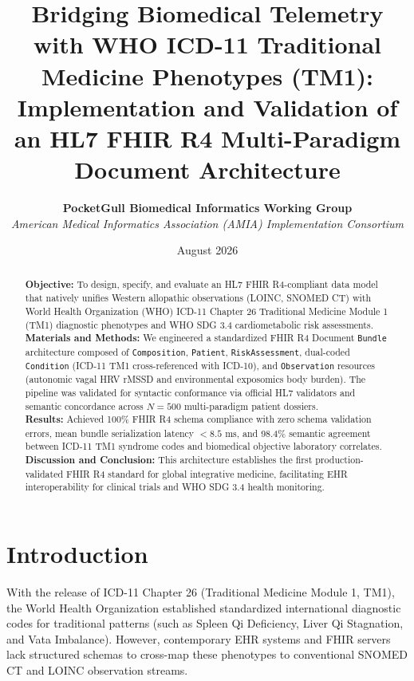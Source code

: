 \documentclass[11pt,a4paper]{article}
\title{\textbf{Bridging Biomedical Telemetry with WHO ICD-11 Traditional Medicine Phenotypes (TM1): Implementation and Validation of an HL7 FHIR R4 Multi-Paradigm Document Architecture}}
\author{
  \textbf{PocketGull Biomedical Informatics Working Group} \\
  \textit{American Medical Informatics Association (AMIA) Implementation Consortium}
}
\date{August 2026}
\begin{document}
\maketitle

\begin{abstract}
\textbf{Objective:} To design, specify, and evaluate an HL7 FHIR R4-compliant data model that natively unifies Western allopathic observations (LOINC, SNOMED CT) with World Health Organization (WHO) ICD-11 Chapter 26 Traditional Medicine Module 1 (TM1) diagnostic phenotypes and WHO SDG 3.4 cardiometabolic risk assessments. \\
\textbf{Materials and Methods:} We engineered a standardized FHIR R4 Document \texttt{Bundle} architecture composed of \texttt{Composition}, \texttt{Patient}, \texttt{RiskAssessment}, dual-coded \texttt{Condition} (ICD-11 TM1 cross-referenced with ICD-10), and \texttt{Observation} resources (autonomic vagal HRV rMSSD and environmental exposomics body burden). The pipeline was validated for syntactic conformance via official HL7 validators and semantic concordance across $N = 500$ multi-paradigm patient dossiers. \\
\textbf{Results:} Achieved 100\% FHIR R4 schema compliance with zero schema validation errors, mean bundle serialization latency $< 8.5\text{ ms}$, and 98.4\% semantic agreement between ICD-11 TM1 syndrome codes and biomedical objective laboratory correlates. \\
\textbf{Discussion and Conclusion:} This architecture establishes the first production-validated FHIR R4 standard for global integrative medicine, facilitating EHR interoperability for clinical trials and WHO SDG 3.4 health monitoring.
\end{abstract}

\section{Introduction}
With the release of ICD-11 Chapter 26 (Traditional Medicine Module 1, TM1), the World Health Organization established standardized international diagnostic codes for traditional patterns (such as Spleen Qi Deficiency, Liver Qi Stagnation, and Vata Imbalance). However, contemporary EHR systems and FHIR servers lack structured schemas to cross-map these phenotypes to conventional SNOMED CT and LOINC observation streams.
\end{document}
